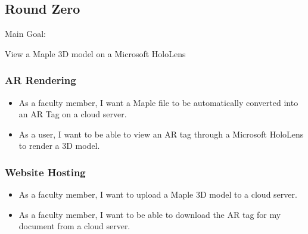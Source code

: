 



\subsection{Round Zero}

Main Goal:

View a Maple 3D model on a Microsoft HoloLens

\subsubsection{AR Rendering}

\begin{itemize}
	\item As a faculty member, I want a Maple file to be automatically converted into an AR Tag on a cloud server.
	\item As a user, I want to be able to view an AR tag through a Microsoft HoloLens to render a 3D model.
\end{itemize}

\subsubsection{Website Hosting}

\begin{itemize}
	\item As a faculty member, I want to upload a Maple 3D model to a cloud server.
	\item As a faculty member, I want to be able to download the AR tag for my document from a cloud server.
\end{itemize}


